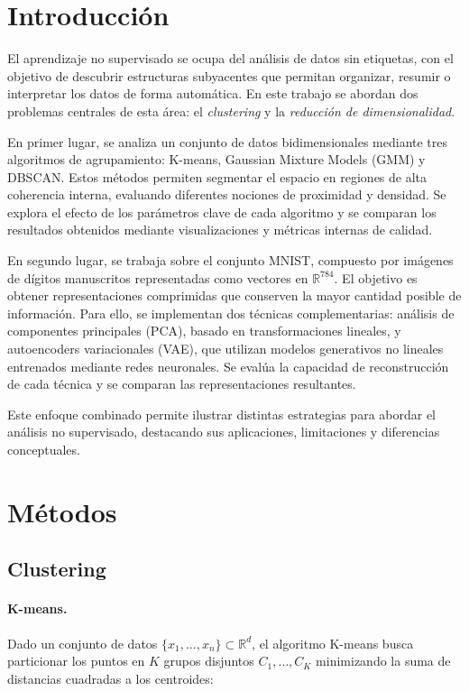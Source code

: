 \documentclass[11pt]{article}
\begin{document}
\section{Introducción}

El aprendizaje no supervisado se ocupa del análisis de datos sin etiquetas, con el objetivo de descubrir estructuras subyacentes que permitan organizar, resumir o interpretar los datos de forma automática. En este trabajo se abordan dos problemas centrales de esta área: el \textit{clustering} y la \textit{reducción de dimensionalidad}.

En primer lugar, se analiza un conjunto de datos bidimensionales mediante tres algoritmos de agrupamiento: K-means, Gaussian Mixture Models (GMM) y DBSCAN. Estos métodos permiten segmentar el espacio en regiones de alta coherencia interna, evaluando diferentes nociones de proximidad y densidad. Se explora el efecto de los parámetros clave de cada algoritmo y se comparan los resultados obtenidos mediante visualizaciones y métricas internas de calidad.

En segundo lugar, se trabaja sobre el conjunto MNIST, compuesto por imágenes de dígitos manuscritos representadas como vectores en $\mathbb{R}^{784}$. El objetivo es obtener representaciones comprimidas que conserven la mayor cantidad posible de información. Para ello, se implementan dos técnicas complementarias: análisis de componentes principales (PCA), basado en transformaciones lineales, y autoencoders variacionales (VAE), que utilizan modelos generativos no lineales entrenados mediante redes neuronales. Se evalúa la capacidad de reconstrucción de cada técnica y se comparan las representaciones resultantes.

Este enfoque combinado permite ilustrar distintas estrategias para abordar el análisis no supervisado, destacando sus aplicaciones, limitaciones y diferencias conceptuales.


\section{Métodos}
\subsection*{Clustering}

\paragraph{K-means.} Dado un conjunto de datos $\{x_1, \dots, x_n\} \subset \mathbb{R}^d$, el algoritmo K-means busca particionar los puntos en $K$ grupos disjuntos $C_1, \dots, C_K$ minimizando la suma de distancias cuadradas a los centroides:
\end{document}
